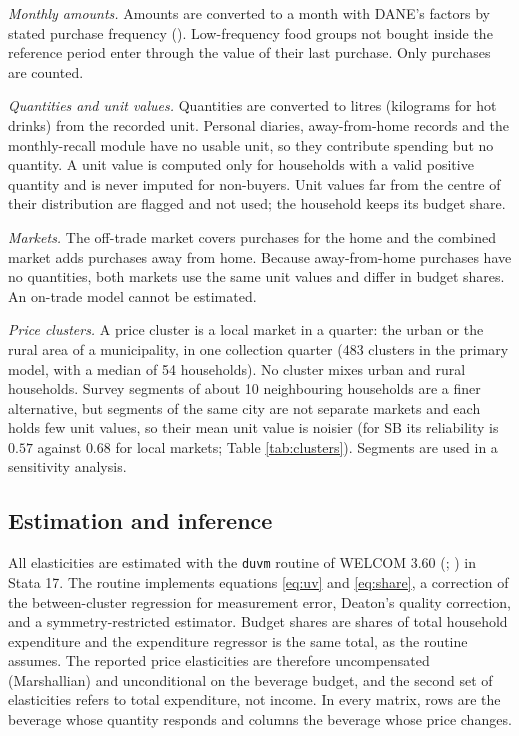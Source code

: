 \documentclass[
  11pt,
]{article}
\begin{document}
\emph{Monthly amounts.} Amounts are converted to a month with DANE's
factors by stated purchase frequency
(). Low-frequency food groups not
bought inside the reference period enter through the value of their last
purchase. Only purchases are counted.

\emph{Quantities and unit values.} Quantities are converted to litres
(kilograms for hot drinks) from the recorded unit. Personal diaries,
away-from-home records and the monthly-recall module have no usable
unit, so they contribute spending but no quantity. A unit value is
computed only for households with a valid positive quantity and is never
imputed for non-buyers. Unit values far from the centre of their
distribution are flagged and not used; the household keeps its budget
share.

\emph{Markets.} The off-trade market covers purchases for the home and
the combined market adds purchases away from home. Because
away-from-home purchases have no quantities, both markets use the same
unit values and differ in budget shares. An on-trade model cannot be
estimated.

\emph{Price clusters.} A price cluster is a local market in a quarter:
the urban or the rural area of a municipality, in one collection quarter
(483 clusters in the primary model, with a median of 54 households). No
cluster mixes urban and rural households. Survey segments of about 10
neighbouring households are a finer alternative, but segments of the
same city are not separate markets and each holds few unit values, so
their mean unit value is noisier (for SB its reliability is \(0.57\)
against \(0.68\) for local markets; Table \ref{tab:clusters}). Segments
are used in a sensitivity analysis.

\subsection{Estimation and inference}\label{estimation-and-inference}

All elasticities are estimated with the \texttt{duvm} routine of WELCOM
3.60 (;
) in Stata 17. The
routine implements equations \eqref{eq:uv} and \eqref{eq:share}, a
correction of the between-cluster regression for measurement error,
Deaton's quality correction, and a symmetry-restricted estimator. Budget
shares are shares of total household expenditure and the expenditure
regressor is the same total, as the routine assumes. The reported price
elasticities are therefore uncompensated (Marshallian) and unconditional
on the beverage budget, and the second set of elasticities refers to
total expenditure, not income. In every matrix, rows are the beverage
whose quantity responds and columns the beverage whose price changes.
\end{document}
